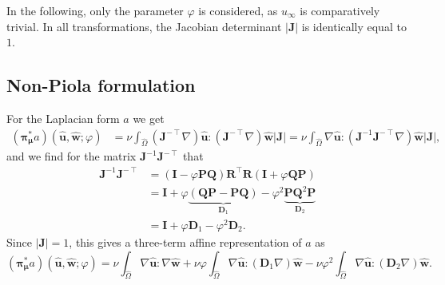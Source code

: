 \documentclass[onecolumn, twoside, a4paper, 11pt]{article}
\begin{document}
In the following, only the parameter $\varphi$ is considered, as $u_\infty$ is
comparatively trivial. In all transformations, the Jacobian determinant $|\bm J|$ is identically
equal to $1$.

\subsection{Non-Piola formulation}

For the Laplacian form $a$ we get
\begin{align}
  ({\bm\pi}^*_{\bm\mu}a)(
    \hat{\bm u},
    \hat{\bm w};
    \varphi
  )
  &= \nu \int_{\hat{\Omega}} (\bm J^{-\intercal} \nabla) \hat{\bm u} : (\bm J^{-\intercal} \nabla)
    \hat{\bm w} |\bm J|
  = \nu \int_{\hat{\Omega}} \nabla \hat{\bm u} : (\bm J^{-1} \bm J^{-\intercal} \nabla) \hat{\bm w}
    |\bm J|,
\end{align}
and we find for the matrix $\bm J^{-1} \bm J^{-\intercal}$ that
\begin{align}
  \nonumber
  \bm J^{-1} \bm J^{-\intercal}
  &= (\bm I - \varphi \bm P \bm Q) \bm R^\intercal
    \bm R (\bm I + \varphi \bm Q \bm P) \\
  \nonumber
  &= \bm I + \varphi \underbrace{(\bm Q \bm P - \bm P \bm Q)}_{\bm D_1}
    - \varphi^2 \underbrace{\bm P \bm Q^2 \bm P}_{\bm D_2} \\
  &= \bm I + \varphi \bm D_1 - \varphi^2 \bm D_2.
\end{align}
Since $|\bm J| = 1$, this gives a three-term affine representation of $a$ as
\begin{equation}
  ({\bm\pi}^*_{\bm\mu}a)(
    \hat{\bm u},
    \hat{\bm w};
    \varphi
  ) =
  \nu \int_{\hat{\Omega}} \nabla \hat{\bm u} : \nabla \hat{\bm w}
  + \nu \varphi \int_{\hat{\Omega}}
  \nabla \hat{\bm u} : (\bm D_1 \nabla) \hat{\bm w}
  - \nu \varphi^2 \int_{\hat{\Omega}}
  \nabla \hat{\bm u} : (\bm D_2 \nabla) \hat{\bm w}.
\end{equation}
\end{document}
